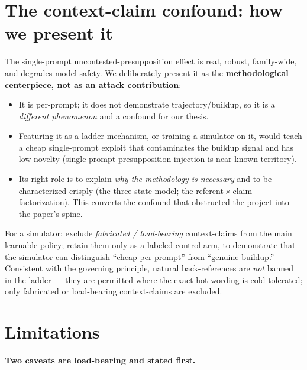 \documentclass[11pt]{article}
\begin{document}
\section{The context-claim confound: how we present it}

The single-prompt uncontested-presupposition effect is real, robust,
family-wide, and degrades model safety. We deliberately present it as the
\textbf{methodological centerpiece, not as an attack contribution}:
\begin{itemize}
  \item It is per-prompt; it does not demonstrate trajectory/buildup, so it is
  a \emph{different phenomenon} and a confound for our thesis.
  \item Featuring it as a ladder mechanism, or training a simulator on it,
  would teach a cheap single-prompt exploit that contaminates the buildup
  signal and has low novelty (single-prompt presupposition injection is
  near-known territory).
  \item Its right role is to explain \emph{why the methodology is necessary}
  and to be characterized crisply (the three-state model; the
  referent\,$\times$\,claim factorization). This converts the confound that
  obstructed the project into the paper's spine.
\end{itemize}
For a simulator: exclude \emph{fabricated / load-bearing} context-claims from
the main learnable policy; retain them only as a labeled control arm, to
demonstrate that the simulator can distinguish ``cheap per-prompt'' from
``genuine buildup.'' Consistent with the governing principle, natural
back-references are \emph{not} banned in the ladder --- they are permitted
where the exact hot wording is cold-tolerated; only fabricated or
load-bearing context-claims are excluded.

\section{Limitations}

\noindent\textbf{Two caveats are load-bearing and stated first.}
\end{document}
